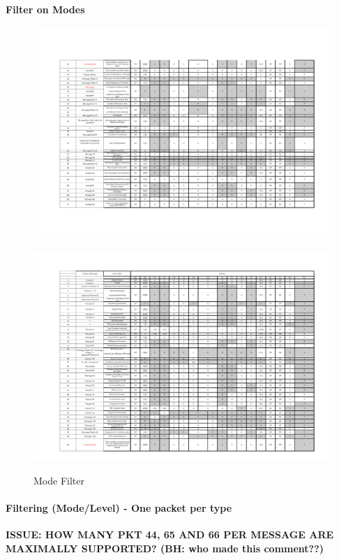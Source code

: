 \documentclass{template/openetcs_report}
\begin{document}
\paragraph{Filter on Modes}
\begin{figure}[hbtp]
\centering
\includegraphics [angle=90, scale=0.8]{images/FilterMode1}
\end{figure}
\begin{figure}[hbtp]
\centering
\includegraphics [angle=90, scale=0.8]{images/FilterMode2}
\end{figure}
\begin{figure}[hbtp]
\centering
\caption{Mode Filter}
\end{figure}
\newpage





\paragraph{Filtering (Mode/Level) - One packet per type}
\textbf{ISSUE: HOW MANY PKT 44, 65 AND 66 PER MESSAGE ARE MAXIMALLY SUPPORTED? (BH: who made this comment??)}\\
\end{document}
